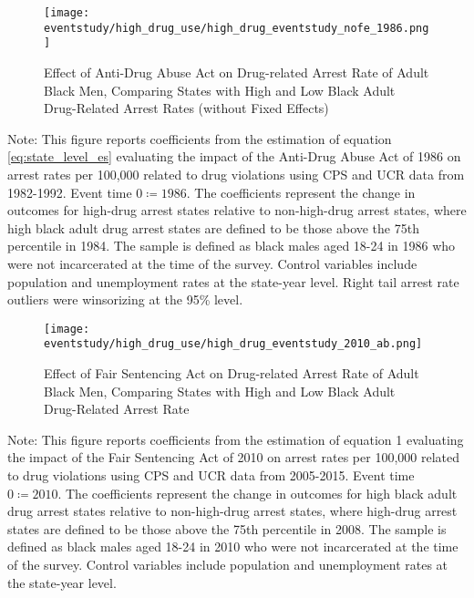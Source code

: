   \begin{figure}[H]
    \caption{Effect of Anti-Drug Abuse Act on Drug-related Arrest Rate of Adult Black Men, Comparing States with High and Low Black Adult Drug-Related Arrest Rates (without Fixed Effects)}
    \centering
    \texttt{[image: eventstudy/high\_drug\_use/high\_drug\_eventstudy\_nofe\_1986.png]}
    \label{fig:ab_es_1986_nofe}
  \end{figure}
  
  \begin{footnotesize}
    \noindent Note: This figure reports coefficients from the estimation of equation \ref{eq:state_level_es} evaluating the impact of the Anti-Drug Abuse Act of 1986 on arrest rates per 100,000 related to drug violations using CPS and UCR data from 1982-1992. Event time $0 \coloneqq 1986$. The coefficients represent the change in outcomes for high-drug arrest states relative to non-high-drug arrest states, where high black adult drug arrest states are defined to be those above the 75th percentile in 1984. The sample is defined as black males aged 18-24 in 1986 who were not incarcerated at the time of the survey. Control variables include population and unemployment rates at the state-year level. Right tail arrest rate outliers were winsorizing at the 95\% level.
  \end{footnotesize}
  
  \clearpage
  
  \begin{figure}[h]
    \caption{Effect of Fair Sentencing Act on Drug-related Arrest Rate of Adult Black Men, Comparing States with High and Low Black Adult Drug-Related Arrest Rate}
    \centering
    \texttt{[image: eventstudy/high\_drug\_use/high\_drug\_eventstudy\_2010\_ab.png]}
    \label{fig:ab_es_2010}
  \end{figure}
  
  \begin{footnotesize}
    \noindent Note: This figure reports coefficients from the estimation of equation 1 evaluating the impact of the Fair Sentencing Act of 2010 on arrest rates per 100,000 related to drug violations using CPS and UCR data from 2005-2015. Event time $0 \coloneqq 2010$. The coefficients represent the change in outcomes for high black adult drug arrest states relative to non-high-drug arrest states, where high-drug arrest states are defined to be those above the 75th percentile in 2008. The sample is defined as black males aged 18-24 in 2010 who were not incarcerated at the time of the survey. Control variables include population and unemployment rates at the state-year level. 
  \end{footnotesize}

